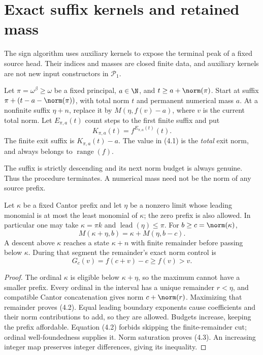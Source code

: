\documentclass[11pt,a4paper]{article}
\newcommand{\KK}[2]{K_{#1,#2}}
\newcommand{\EE}[2]{E_{#1,#2}}
\begin{document}
\section{Exact suffix kernels and retained mass}
The sign algorithm uses auxiliary kernels to expose the terminal peak of
a fixed source head. Their indices and masses are closed finite data,
and auxiliary kernels are not new input constructors in $\mathcal P_1$.

\begin{definition}\label{def:kernel}
Let $\pi=\omega^\beta\ge\omega$ be a fixed principal, $a\in\N$, and
$t\ge a+\norm(\pi)$. Start at suffix
$\pi+(t-a-\norm(\pi))$, with total norm $t$ and permanent numerical mass
$a$. At a nonfinite suffix $\eta+n$, replace it by
$M(\eta,f(v)-a)$, where $v$ is the current total norm.
Let $\EE\pi a(t)$ count steps to the first finite suffix and put
\[
              \KK\pi a(t)=f^{\EE\pi a(t)}(t).        \tag{4.1}
\]
The finite exit suffix is $\KK\pi a(t)-a$. The value in (4.1) is the
\emph{total} exit norm, and always belongs to $\operatorname{range}(f)$.
\end{definition}
The suffix is strictly descending and its next norm budget is always
genuine. Thus the procedure terminates. A numerical mass need not be the
norm of any source prefix.

\begin{lemma}\label{lem:prefix}
Let $\kappa$ be a fixed Cantor prefix and let $\eta$ be a nonzero limit
whose leading monomial is at most the least monomial of $\kappa$;
the zero prefix is also allowed. In particular one may take
$\kappa=\pi k$ and $\operatorname{lead}(\eta)\le\pi$.
For $b\ge c=\norm(\kappa)$,
\[
 M(\kappa+\eta,b)=\kappa+M(\eta,b-c).                \tag{4.2}
\]
A descent above $\kappa$ reaches a state $\kappa+n$ with finite remainder
before passing below $\kappa$. During that segment the remainder's exact
norm control is
\[
                   G_c(v)=f(c+v)-c\ge f(v)>v.         \tag{4.3}
\]
\end{lemma}
\begin{proof}
The ordinal $\kappa$ is eligible below $\kappa+\eta$, so the maximum cannot
have a smaller prefix. Every ordinal in the interval has a unique remainder
$r<\eta$, and compatible Cantor concatenation gives norm $c+\norm(r)$.
Maximizing that remainder proves (4.2). Equal leading boundary exponents
cause coefficients and their norm contributions to add, so they are allowed.
Budgets increase, keeping the prefix affordable. Equation (4.2) forbids
skipping the finite-remainder cut; ordinal well-foundedness supplies it.
Norm saturation proves (4.3). An increasing integer map preserves integer
differences, giving its inequality.
\end{proof}
\end{document}
